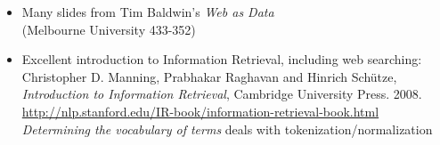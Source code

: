 \documentclass[a4paper,landscape,headrule,footrule,xetex]{foils}
\begin{document}

\begin{itemize}
\item Many slides from Tim Baldwin's \textit{Web as Data} 
  \\ (Melbourne University 433-352)
\item Excellent introduction to Information Retrieval, including web searching:
\\ Christopher D. Manning, Prabhakar Raghavan and Hinrich Schütze, \textit{Introduction to Information Retrieval}, Cambridge University Press. 2008. 
\\ \url{http://nlp.stanford.edu/IR-book/information-retrieval-book.html}
\\ \textit{Determining the vocabulary of terms} deals with tokenization/normalization
\end{itemize}
\end{document}
